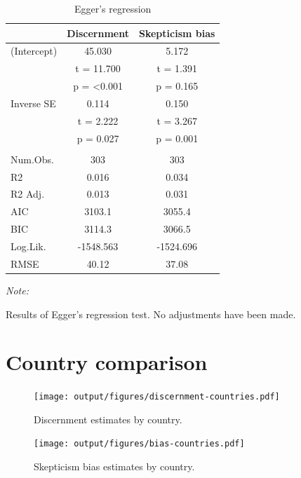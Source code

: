 \documentclass[
  man]{apa6}
\begin{document}
\begin{table}
\centering
\caption{\label{tab:egger}Egger's regression}
\centering
\begin{threeparttable}
\begin{tabular}[t]{lcc}
\toprule
  & Discernment & Skepticism  bias\\
\midrule
(Intercept) & 45.030 & 5.172\\
 & t = 11.700 & t = 1.391\\
 & p = <0.001 & p = 0.165\\
Inverse SE & 0.114 & 0.150\\
 & t = 2.222 & t = 3.267\\
 & p = 0.027 & p = 0.001\\
\midrule\\
Num.Obs. & 303 & 303\\
R2 & 0.016 & 0.034\\
R2 Adj. & 0.013 & 0.031\\
AIC & 3103.1 & 3055.4\\
BIC & 3114.3 & 3066.5\\
Log.Lik. & -1548.563 & -1524.696\\
RMSE & 40.12 & 37.08\\
\bottomrule
\end{tabular}
\begin{tablenotes}
\item \textit{Note: } 
\item Results of Egger's regression test. No adjustments have been made.
\end{tablenotes}
\end{threeparttable}
\end{table}

\clearpage

\section{Country comparison}\label{country-comparison}

\FloatBarrier



\begin{figure}
\centering
\texttt{[image: output/figures/discernment-countries.pdf]}
\caption{\label{fig:discernment-countries}Discernment estimates by country.}
\end{figure}



\begin{figure}
\centering
\texttt{[image: output/figures/bias-countries.pdf]}
\caption{\label{fig:bias-countries}Skepticism bias estimates by country.}
\end{figure}
\end{document}
